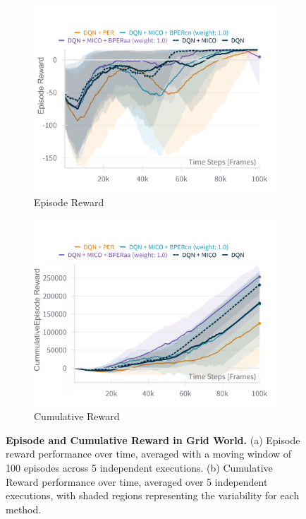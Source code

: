 \begin{figure}[!h]
    \centering
    \begin{subfigure}{0.45\textwidth}
    \includegraphics[width=\linewidth]{Results/grid_world/episode_reward_grid_world_window_100.png}
        \caption{Episode Reward}
        \label{fig:episode_reward_grid_world}
    \end{subfigure}
    \hfill
    \begin{subfigure}{0.45\textwidth}
        \includegraphics[width=\linewidth]{Results/grid_world/cumulative_episode_return.png}
        \caption{Cumulative Reward}
        \label{fig:cumulative_reward}
    \end{subfigure}
    \caption[Episode and Cumulative Reward in Grid World]{\textbf{Episode and Cumulative Reward in Grid World.} (a) Episode reward performance over time, averaged with a moving window of 100 episodes across 5 independent executions. (b) Cumulative Reward performance over time, averaged over 5 independent executions, with shaded regions representing the variability for each method.}
    \label{fig:cumulative_episode_reward}
\end{figure}

